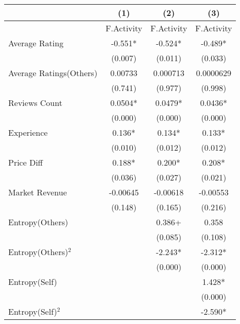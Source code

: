 \begin{table}[]
\centering
\begin{tabular}{@{}lccc@{}}
\toprule
                                   & (1)        & (2)        & (3)        \\ \midrule
                                   & F.Activity & F.Activity & F.Activity \\
Average Rating                     & -0.551*    & -0.524*    & -0.489*    \\
                                   & (0.007)    & (0.011)    & (0.033)    \\
Average Ratings(Others)            & 0.00733    & 0.000713   & 0.0000629  \\
                                   & (0.741)    & (0.977)    & (0.998)    \\
Reviews Count                      & 0.0504*    & 0.0479*    & 0.0436*    \\
                                   & (0.000)    & (0.000)    & (0.000)    \\
Experience                         & 0.136*     & 0.134*     & 0.133*     \\
                                   & (0.010)    & (0.012)    & (0.012)    \\
Price Diff                         & 0.188*     & 0.200*     & 0.208*     \\
                                   & (0.036)    & (0.027)    & (0.021)    \\
Market Revenue                     & -0.00645   & -0.00618   & -0.00553   \\
                                   & (0.148)    & (0.165)    & (0.216)    \\
Entropy(Others)                    &            & 0.386+     & 0.358      \\
                                   &            & (0.085)    & (0.108)    \\
Entropy(Others)$^2$ &            & -2.243*    & -2.312*    \\
                                   &            & (0.000)    & (0.000)    \\
Entropy(Self)                      &            &            & 1.428*     \\
                                   &            &            & (0.000)    \\
Entropy(Self)$^2$     &            &            & -2.590*    \\

\end{tabular}
\end{table}
